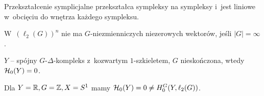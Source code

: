 \begin{definicja}
	Przekształcenie symplicjalne przekształca sympleksy na sympleksy 
	i~jest liniowe w~obcięciu do wnętrza każdego sympleksu.
\end{definicja}

\begin{lemat}
	W~$(\ell_2(G))^n$ nie ma $G$-niezmienniczych niezerowych wektorów, jeśli $|G| = \infty$.
\end{lemat}

\begin{przyklad}
	$Y$ -- spójny $G$-$\Delta$-kompleks z~kozwartym $1$-szkieletem,
	$G$ nieskończona, wtedy ${\mathcal{H}}_0(Y) = 0$.
\end{przyklad}

\begin{przyklad}
	Dla $Y = {\mathbb{R}}, G = {\mathbb{Z}}, X = S^1$ 
	mamy ${\mathcal{H}}_0(Y) = 0 \neq H_0^G(Y, \ell_2(G))$.
\end{przyklad}














